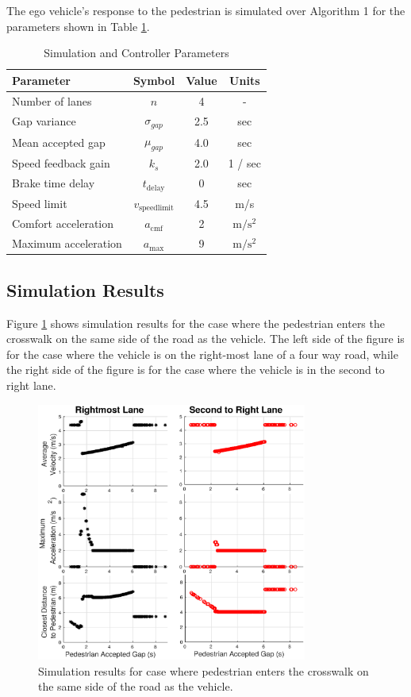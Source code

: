 \documentclass[letterpaper, 10 pt, conference]{ieeeconf}  %
\begin{document}
The ego vehicle's response to the pedestrian is simulated over Algorithm 1 for the parameters shown in Table \ref{tb:params}.  

\begin{table}[h]
\footnotesize
\begin{center}
\caption{Simulation and Controller Parameters}\label{tb:params}
\begin{tabular}{lccc}
Parameter & Symbol & Value & Units \\\hline\hline
Number of lanes & $n$ & 4 & - \\
Gap variance & $\sigma_{gap}$ & 2.5 & sec\\
Mean accepted gap & $\mu_{gap}$ & 4.0 & sec\\\hline
Speed feedback gain & $k_s$ & 2.0 & 1 / sec\\
Brake time delay    & $t_\mathrm{delay}$ & 0 & sec \\ 
Speed limit & $v_\mathrm{speedlimit}$ & 4.5 & m/s \\
Comfort acceleration & $a_\mathrm{cmf}$ & 2 & $\mathrm{m/s^2}$ \\
Maximum acceleration & $a_\mathrm{max}$ & 9 & $\mathrm{m/s^2}$ \\\hline
\end{tabular}
\end{center}
\end{table}

\subsection{Simulation Results}

Figure \ref{fig:velPlot1} shows simulation results for the case where the pedestrian enters the crosswalk on the same side of the road as the vehicle. The left side of the figure is for the case where the vehicle is on the right-most lane of a four way road, while the right side of the figure is for the case where the vehicle is in the second to right lane. 

\begin{figure}
\centering
\includegraphics[width=3.5in]{figures/velPlot.eps}
\caption{Simulation results for case where pedestrian enters the crosswalk on the same side of the road as the vehicle.}
\label{fig:velPlot1}
\end{figure}
\end{document}
